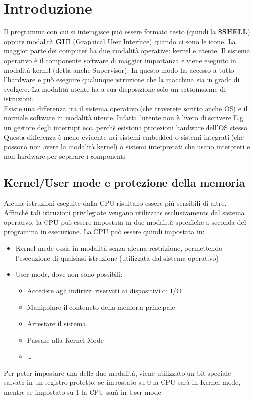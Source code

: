 \documentclass{article}
\begin{document}
\section{Introduzione}
Il programma con cui si interagisce può essere formato testo (quindi la \textbf{\$SHELL}) oppure modalità \textbf{GUI} (Graphical User Interface) quando ci sono le icone. La maggior parte dei computer ha due modalità operative: kernel e utente. Il sistema operativo è il componente software di maggior importanza e viene eseguito in modalità kernel (detta anche Supervisor). In questo modo ha accesso a tutto l'hardware e può eseguire qualunque istruzione che la macchina sia in  grado di svolgere. La modalità utente ha a sua disposizione solo un sottoinsieme di istruzioni.\\
Esiste una differenza tra il sistema operativo (che troverete scritto anche OS) e il normale software in modalità utente. Infatti l'utente non è livero di scrivere E.g un gestore degli interrupt ecc\dots perchè esistono protezioni hardware dell'OS stesso \\
Questa differenza è meno evidente nei sistemi embedded o sistemi integrati (che possono non avere la modalità kernel) o sistemi interpretati che usano interpreti e non hardware per separare i componenti

\subsection{Kernel/User mode e protezione della memoria}
Alcune istruzioni eseguite dalla CPU risultano essere più sensibili di altre. Affinché tali istruzioni privilegiate vengano utilizzate esclusivamente dal sistema operativo, la CPU può essere impostata in due modalità specifiche a seconda del programma in esecuzione.
La CPU può essere quindi impostata in:
\begin{itemize}
    \item Kernel mode ossia in modalità senza alcuna restrizione, permettendo l'esecuzione di qualsiasi istruzione (utilizzata dal sistema operativo)
    \item User mode, dove non sono possibili:
    \begin{itemize}
        \item Accedere agli indirizzi riservati ai dispositivi di I/O 
        \item Manipolare il contenuto della memoria principale
        \item Arrestare il sistema
        \item Passare alla Kernel Mode
        \item \dots
    \end{itemize}

\end{itemize}
Per poter impostare una delle due modalità, viene utilizzato un bit speciale salvato in un registro protetto: se impostato su 0 la CPU sarà in Kernel mode, mentre se impostato su 1 la CPU sarà in User mode
\end{document}

